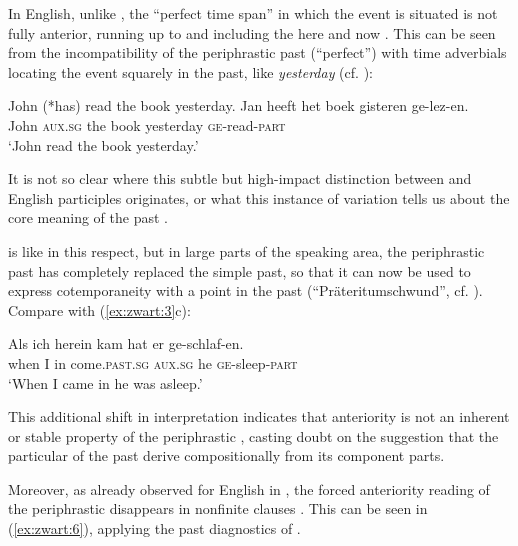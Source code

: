 \documentclass[output=paper]{LSP/langsci}
\begin{document}
In English, unlike , the ``perfect time span'' in which the event is situated is not fully anterior, running up to and including the here and now \citep{IatridouEtAl2001}. This can be seen from the incompatibility of the periphrastic past (``perfect'') with time adverbials locating the event squarely in the past, like \textit{yesterday} (cf. \citealt{Klein1992,Zwart2008}):

\settowidth{}
\ea%
\label{ex:zwart:4}
\ea  John (*has) read the book yesterday.
\ex \gll  Jan  heeft    het  boek  gisteren    ge-lez-en. \\
          John \textsc{aux.sg} the  book  yesterday  \textsc{ge}{}-read-\textsc{part}\\
    \glt ‘John read the book yesterday.’
\z\z
    
\noindent It is not so clear where this subtle but high-impact distinction between  and English participles originates, or what this instance of variation tells us about the core meaning of the past .

 is like  in this respect, but in large parts of the  speaking area, the periphrastic past  has completely replaced the simple past, so that it can now be used to express cotemporaneity with a  point in the past (``Präteritumschwund'', cf. \citealt{AbrahamConradie2001}). Compare   with  (\ref{ex:zwart:3}c):

\settowidth{}
\ea%
    \label{ex:zwart:5}
\gll Als  ich  herein  kam    hat  er  ge-schlaf-en.\\
     when  I  in  come.\textsc{past.sg}  \textsc{aux.sg}  he  \textsc{ge}{}-sleep-\textsc{part}\\
\glt  ‘When I came in he was asleep.’
\z

\noindent This additional shift in interpretation indicates that anteriority is not an inherent or stable property of the periphrastic , casting doubt on the suggestion that the particular  of the   past derive compositionally from its  component parts.

Moreover, as already observed for English in \citet[8]{Hoffmann1966}, the forced anteriority reading of the periphrastic  disappears in  nonfinite clauses \citep{Zwart2014}. This can be seen in (\ref{ex:zwart:6}), applying the past  diagnostics of .
\end{document}
